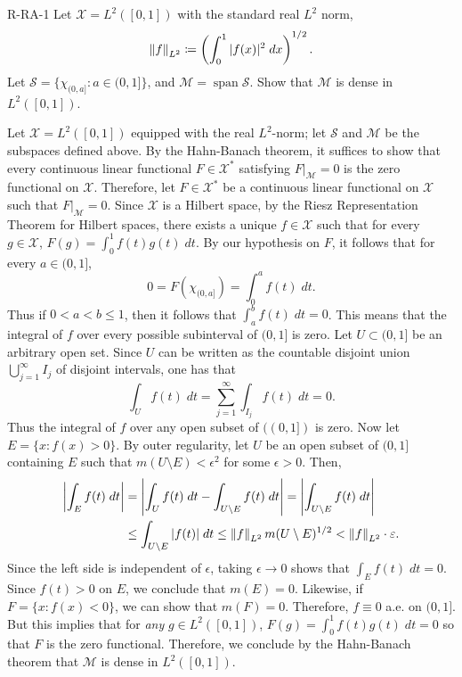 \documentclass{article}
\begin{document}
	\begin{prb}{R-RA-1}
		Let $\mathscr{X} = L^{2}([0,1])$ with the standard real $L^{2}$ norm, 
		\begin{equation*}
			\left\Vert f \right\Vert_{L^{2}} \coloneqq \left(\int_{0}^{1}|f(x)|^{2}\;dx\right)^{1/2}. 
		\end{equation*}
		Let $\mathscr{S} = \{\chi_{(0,a]}: a \in (0,1]\}$, and $\mathscr{M} = \operatorname{span}{\mathscr{S}}$. Show that $\mathscr{M}$ is dense in $L^{2}([0,1])$. 
	\end{prb}
	Let $\mathscr{X} = L^{2}([0,1])$ equipped with the real $L^{2}$-norm; let $\mathscr{S}$ and $\mathscr{M}$ be the subspaces defined above. By the Hahn-Banach theorem, it suffices to show that every continuous linear functional $F \in \mathscr{X}^{\ast}$ satisfying $F|_{\mathscr{M}} = 0$ is the zero functional on $\mathscr{X}$. Therefore, let $F \in \mathscr{X}^{\ast}$ be a continuous linear functional on $\mathscr{X}$ such that $F|_{\mathscr{M}} = 0$. Since $\mathscr{X}$ is a Hilbert space, by the Riesz Representation Theorem for Hilbert spaces, there exists a unique $f \in \mathscr{X}$ such that for every $g \in \mathscr{X}$, $F(g) = \int_{0}^{1}f(t)g(t)\;dt$. By our hypothesis on $F$, it follows that for every $a \in (0,1]$, 
	\begin{equation*}
		0 = F(\chi_{(0,a]}) = \int_{0}^{a}f(t)\;dt. 
	\end{equation*}
	Thus if $0 < a < b \leq 1$, then it follows that $\int_{a}^{b}f(t)\;dt = 0$. This means that the integral of $f$ over every possible subinterval of $(0,1]$ is zero. Let $U \subset (0,1]$ be an arbitrary open set. Since $U$ can be written as the countable disjoint union $\bigcup_{j = 1}^{\infty}I_{j}$ of disjoint intervals, one has that 
	\begin{equation*}
		\int_{U}f(t)\;dt = \sum_{j = 1}^{\infty}\int_{I_{j}}f(t)\;dt = 0. 
	\end{equation*}
	Thus the integral of $f$ over any open subset of $((0,1])$ is zero. Now let $E = \{x: f(x) > 0\}$. By outer regularity, let $U$ be an open subset of $(0,1]$ containing $E$ such that $m(U\setminus E) < \epsilon^{2}$ for some $\epsilon > 0$. Then, 
	\begin{align*}
		\begin{split}
			\left| \int_{E}f(t)\;dt \right| &= \left| \int_{U}f(t)\;dt - \int_{U\setminus E}f(t)\;dt \right| = \left| \int_{U\setminus E}f(t)\;dt \right| \\
			&\leq \int_{U \setminus E}|f(t)|\;dt \leq \left\Vert f \right\Vert_{L^{2}}m(U \setminus E)^{1/2} < \left\Vert f \right\Vert_{L^{2}} \cdot \varepsilon.
		\end{split} 
	\end{align*}
	Since the left side is independent of $\epsilon$, taking $\epsilon \to 0$ shows that $\int_{E}f(t)\;dt = 0$. Since $f(t) > 0$ on $E$, we conclude that $m(E) = 0$. Likewise, if $F = \{x : f(x) < 0\}$, we can show that $m(F) = 0$. Therefore, $f \equiv 0$ a.e. on $(0,1]$. But this implies that for \textit{any} $g \in L^{2}([0,1])$, $F(g) = \int_{0}^{1}f(t)g(t)\;dt = 0$ so that $F$ is the zero functional. Therefore, we conclude by the Hahn-Banach theorem that $\mathscr{M}$ is dense in $L^{2}([0,1])$. 
	
\end{document}

